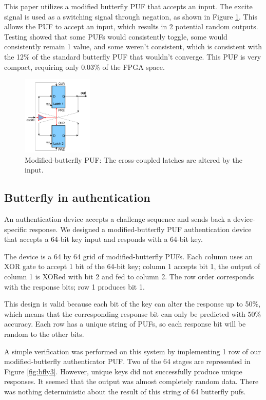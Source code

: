 	This paper utilizes a modified butterfly PUF that accepts an input. The excite signal is used as a switching signal through negation, as shown in Figure \ref{fig:bfly2}. This allows the PUF to accept an input, which results in 2 potential random outputs. Testing showed that some PUFs would consistently toggle, some would consistently remain 1 value, and some weren't consistent, which is consistent with the 12\% of the standard butterfly PUF that wouldn't converge. This PUF is very compact, requiring only 0.03\% of the FPGA space. 
		\begin{figure}[tbph]
			\centering
			\includegraphics[width=0.3\textwidth]{bfly2.png}
			\caption{Modified-butterfly PUF: The cross-coupled latches are altered by the input.}\label{fig:bfly2}
		\end{figure}
		

	\subsection{Butterfly in authentication}
		An authentication device accepts a challenge sequence and sends back a device-specific response. We designed a modified-butterfly PUF authentication device that accepts a 64-bit key input and responds with a 64-bit key. 

		The device is a 64 by 64 grid of modified-butterfly PUFs. Each column uses an XOR gate to accept 1 bit of the 64-bit key; column 1 accepts bit 1, the output of column 1 is XORed with bit 2 and fed to column 2. The row order corresponds with the response bits; row 1 produces bit 1. 

		This design is valid because each bit of the key can alter the response up to 50\%, which means that the corresponding response bit can only be predicted with 50\% accuracy. Each row has a unique string of PUFs, so each response bit will be random to the other bits. 

		A simple verification was performed on this system by implementing 1 row of our modified-butterfly authenticator PUF. Two of the 64 stages are represented in Figure \ref{fig:bfly3}. However, unique keys did not successfully produce unique responses.  It seemed that the output was almost completely random data.  There was nothing deterministic about the result of this string of 64 butterfly pufs.
		
